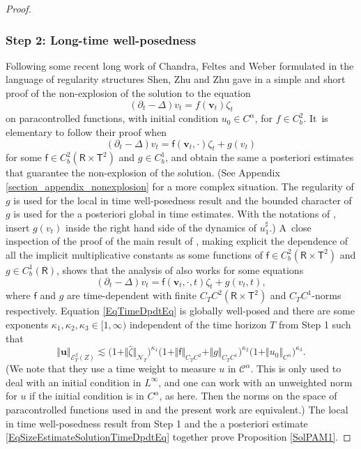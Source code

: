 \documentclass[JEP,XML,SOM,Unicode,published]{cedram}
\theoremstyle{definition}
\newcommand\bbR{\mathbf{\mathsf{R}}}
\newcommand{\mcE}{\mathcal{E}}
\newcommand{\mcN}{\mathcal{N}}
\newcommand{\bsu}{\boldsymbol{u}}
\newcommand{\bsv}{\boldsymbol{v}}
\newcommand{\scrC}{\ensuremath{\mathscr{C}}}
\begin{document}
\begin{proof}
\subsubsection*{Step 2: Long-time well-posedness} Following some recent long work of Chandra, Feltes and Weber \cite{CFW} formulated in the language of regularity structures Shen, Zhu and Zhu gave in \cite{ShenZhuZhu} a simple and short proof of the non-explosion of the solution to the equation
\[
(\partial_t - \Delta)v_t = f(\bsv_t) \zeta_t
\]
on paracontrolled functions, with initial condition $u_0\in C^\alpha$, for $f\in C^2_b$. It~is elementary to follow their proof when
\[
(\partial_t - \Delta)v_t = \mathsf{f}(\bsv_t,\cdot) \zeta_t + g(v_t)
\]
for some $\mathsf{f}\in C^2_b(\bbR\times\mathsf{T}^2)$ and $g\in C^1_b$, and obtain the same a posteriori estimates that guarantee the non-explosion of the solution. (See Appendix \ref{section_appendix_nonexplosion} for a more complex situation. The regularity of $g$ is used for the local in time well-posedness result and the bounded character of $g$ is used for the a posteriori global in time estimates. With the notations of \cite{ShenZhuZhu}, insert $g(v_t)$ inside the right hand side of the dynamics of $u_1^\sharp$.) A~close inspection of the proof of the main result of \cite{ShenZhuZhu}, making explicit the dependence of all the implicit multiplicative constants as some functions of $\mathsf{f}\in C^2_b(\bbR\times\mathsf{T}^2)$ and $g\in C^1_b(\bbR)$, shows that the analysis of \cite{ShenZhuZhu} also works for some equations
\begin{equation} \label{EqTimeDpdtEq}
(\partial_t - \Delta)v_t = \mathsf{f}(\bsv_t, \cdot, t) \zeta_t + g(v_t,t),
\end{equation}
where $\mathsf{f}$ and $g$ are time-dependent with finite $C_TC^2(\bbR\times\mathsf{T}^2)$ and $C_TC^1$-norms respectively. Equation \eqref{EqTimeDpdtEq} is globally well-posed and there are some exponents $\kappa_1,\kappa_2, \kappa_3\in [1,\infty)$ independent of the time horizon $T$ from Step 1 such that
\begin{equation} \label{EqSizeEstimateSolutionTimeDpdtEq}
\Vert \bsu\Vert_{\mcE_T^\beta(Z)} \lesssim \bigl(1 + \Vert\widehat\zeta\Vert_{{\boldsymbol{\mcN}}_T}\bigr)^{\kappa_1} \bigl( 1 + \Vert \mathsf{f}\Vert_{C_TC^2} + \Vert g\Vert_{C_TC^1}\bigr)^{\kappa_2} \bigl(1+\Vert u_0\Vert_{C^\alpha}\bigr)^{\kappa_3}.
\end{equation}
(We note that they use a time weight to measure $u$ in $\scrC^\alpha$. This is only used to deal with an initial condition in $L^\infty$, and one can work with an unweighted norm for $u$ if the initial condition is in $C^\alpha$, as here. Then the norms on the space of paracontrolled functions used in \cite{ShenZhuZhu} and the present work are equivalent.) The local in time well-posedness result from Step 1 and the a posteriori estimate \eqref{EqSizeEstimateSolutionTimeDpdtEq} together prove Proposition \ref{SolPAM1}.
\end{proof}
\end{document}
